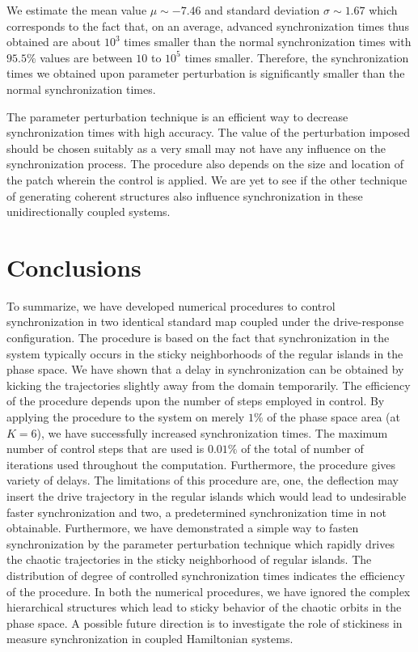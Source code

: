 \documentclass[reprint,superscriptaddress,amsmath,amssymb,aps,pre]{revtex4-1}
\begin{document}
We estimate the mean value $\mu \sim -7.46$ and standard deviation $\sigma 
\sim1.67$ which corresponds to the fact that, on an average, advanced 
synchronization times thus obtained are about $10^3$ times smaller than the 
normal synchronization times with $95.5\%$ values are between $10$ to $10^5$ 
times smaller.  Therefore, the synchronization times we obtained upon 
parameter perturbation is significantly smaller than the normal 
synchronization times.

The parameter perturbation technique is an efficient way to decrease synchronization times with high accuracy.  The value of the perturbation imposed should be chosen suitably as a very small may not have any influence on the synchronization process. The procedure also depends on the size and location of the patch wherein the control is applied. We are yet to see if the other technique of generating coherent structures also influence synchronization in these unidirectionally coupled systems. 


\section{Conclusions}
\label{sec:conclusions}
To summarize, we have developed numerical procedures to control 
synchronization in two identical standard map coupled under the drive-response 
configuration. The procedure is based on the fact that synchronization in the 
system typically occurs in the sticky neighborhoods of the regular islands in 
the phase space. We have shown that a delay in synchronization can be obtained 
by kicking the trajectories slightly away from the domain temporarily. The 
efficiency of the procedure depends upon the number of steps employed in 
control. By applying the procedure to the system on merely $1\%$ of the phase 
space area (at $K = 6$), we have successfully increased synchronization times. 
The maximum number of control steps that are used is $0.01\%$ of the total of 
number of iterations used throughout the computation.  Furthermore, the 
procedure gives variety of delays. The limitations of this procedure are, one, 
the deflection may insert the drive trajectory in the regular islands which 
would lead to undesirable faster synchronization and two, a predetermined 
synchronization time in not obtainable. Furthermore, we have demonstrated a 
simple way to fasten synchronization by the parameter perturbation technique 
which rapidly drives the chaotic trajectories in the sticky neighborhood of 
regular islands. The distribution of degree of controlled synchronization 
times indicates the efficiency of the procedure. In both the numerical 
procedures, we have ignored the complex hierarchical structures which lead to 
sticky behavior of the chaotic orbits in the phase space. A possible future 
direction is to investigate the role of stickiness in measure synchronization 
in coupled Hamiltonian systems.
\end{document}

